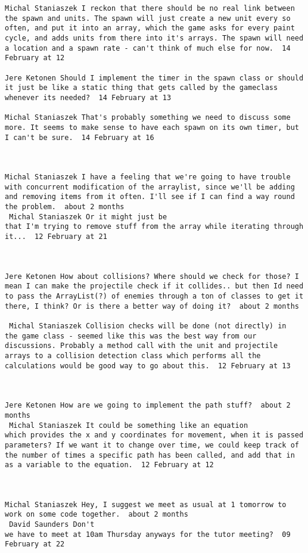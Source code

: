\begin{verbatim}
Michal Staniaszek I reckon that there should be no real link between
the spawn and units. The spawn will just create a new unit every so
often, and put it into an array, which the game asks for every paint
cycle, and adds units from there into it's arrays. The spawn will need
a location and a spawn rate - can't think of much else for now.  14
February at 12

Jere Ketonen Should I implement the timer in the spawn class or should
it just be like a static thing that gets called by the gameclass
whenever its needed?  14 February at 13

Michal Staniaszek That's probably something we need to discuss some
more. It seems to make sense to have each spawn on its own timer, but
I can't be sure.  14 February at 16



Michal Staniaszek I have a feeling that we're going to have trouble
with concurrent modification of the arraylist, since we'll be adding
and removing items from it often. I'll see if I can find a way round
the problem.  about 2 months 
 Michal Staniaszek Or it might just be
that I'm trying to remove stuff from the array while iterating through
it...  12 February at 21



Jere Ketonen How about collisions? Where should we check for those? I
mean I can make the projectile check if it collides.. but then Id need
to pass the ArrayList(?) of enemies through a ton of classes to get it
there, I think? Or is there a better way of doing it?  about 2 months

 Michal Staniaszek Collision checks will be done (not directly) in
the game class - seemed like this was the best way from our
discussions. Probably a method call with the unit and projectile
arrays to a collision detection class which performs all the
calculations would be good way to go about this.  12 February at 13



Jere Ketonen How are we going to implement the path stuff?  about 2
months 
 Michal Staniaszek It could be something like an equation
which provides the x and y coordinates for movement, when it is passed
parameters? If we want it to change over time, we could keep track of
the number of times a specific path has been called, and add that in
as a variable to the equation.  12 February at 12



Michal Staniaszek Hey, I suggest we meet as usual at 1 tomorrow to
work on some code together.  about 2 months 
 David Saunders Don't
we have to meet at 10am Thursday anyways for the tutor meeting?  09
February at 22


\end{verbatim}
